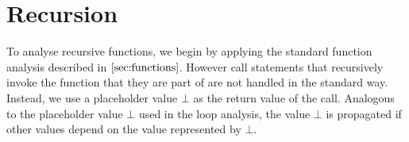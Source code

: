 \section{Recursion}
To analyse recursive functions, we begin by applying the standard function analysis described in $\ref{sec:functions}$. However call statements that recursively invoke the function that they are part of are not handled in the standard way. Instead, we use a placeholder value $\bot$ as the return value of the call. Analogous to the placeholder value $\bot$ used in the loop analysis, the value $\bot$ is propagated if other values depend on the value represented by $\bot$.

\iffalse
\begin{figure}
    \begin{subfigure}{.5\textwidth}
        \centering
    \begin{algorithm}[H]
        \hspace*{\algorithmicindent} \textbf{Input} $\mIn: int$ \\
        \hspace*{\algorithmicindent} \textbf{Output} $\mOut: int$\\
        \begin{algorithmic}[1]
            \State $\mOut \leftarrow $ \textsc{sumRec}$(\mIn, 0)$
            \vspace{1em}
            \Procedure{sumRec}{$x: int, \: y: int$}: int
            \If{$x == 0$}
                \State $z_0: int \leftarrow y$ 
                \Else
                \State $z_1: int \leftarrow$ \textsc{sumRec}$(x - 1, y + 1)$
            \EndIf
            \State $z_2 \leftarrow \phi(z_0, z_1)$
            \State \Return $z_2$
            \EndProcedure
        \end{algorithmic} 
    \end{algorithm}
    \caption{Program containing a recursive function. The recursive function takes two arguments and adds their values together.}\label{fig:rec}
    \end{subfigure}
    \hfill
    \begin{subfigure}{.45\textwidth}
    \centering
        \begin{align*}
    dVec(x) := & [x^2 x^1 x^0] \\
    dVec(y) := & [y^2 y^1 x^0] \\
    dVec(z_0) := & [y^2 y^1 y^0] \\
    dVec(z_1) := & \bot \\
    dVec(z_2) := & \mathbb{IF}([x^2 x^1 x^0] == [000]), \\
    & \: [y^2 y^1 y^0], \: \bot)
\end{align*}
    \caption{Dependency vectors for the values in \textsc{sumRec}$(\cdot, \cdot)$}
    \end{subfigure}
    \caption{Example demonstrating the analysis of recursive functions}\label{fig:rec}
\end{figure}
\fi

